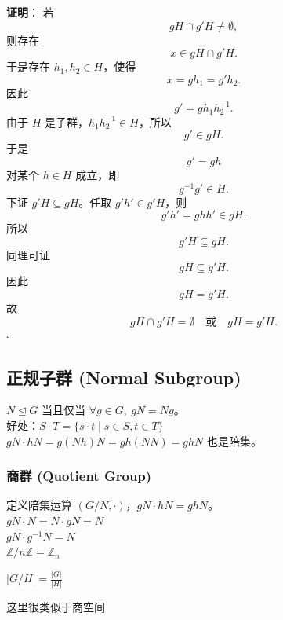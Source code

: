 \documentclass[12pt, a4paper]{article}
\begin{document}
\textbf{证明}：
若
\[
gH \cap g'H \neq \emptyset,
\]
则存在
\[
x \in gH \cap g'H.
\]
于是存在 \(h_1,h_2 \in H\)，使得
\[
x=gh_1=g'h_2.
\]
因此
\[
g'=g h_1 h_2^{-1}.
\]
由于 \(H\) 是子群，\(h_1h_2^{-1}\in H\)，所以
\[
g' \in gH.
\]
于是
\[
g'=gh
\]
对某个 \(h\in H\) 成立，即
\[
g^{-1}g' \in H.
\]
下证 \(g'H \subseteq gH\)。任取 \(g'h'\in g'H\)，则
\[
g'h'=g h h' \in gH.
\]
所以
\[
g'H \subseteq gH.
\]
同理可证
\[
gH \subseteq g'H.
\]
因此
\[
gH=g'H.
\]
故
\[
gH \cap g'H = \emptyset
\quad\text{或}\quad
gH = g'H.
\]
\hfill \(\square\)

\subsection*{正规子群 (Normal Subgroup)}
$N \trianglelefteq G$ 当且仅当 $\forall g \in G, \ gN = Ng$。\\
好处：$S \cdot T = \{s \cdot t \mid s \in S, t \in T\}$ \\
$gN \cdot hN = g(Nh)N = gh(NN) = ghN$ 也是陪集。

\subsubsection*{商群 (Quotient Group)}
定义陪集运算 $(G/N, \cdot)$，$gN \cdot hN = ghN$。\\
$gN \cdot N = N \cdot gN = N$ \\
$gN \cdot g^{-1}N = N$ \\
$\mathbb{Z} / n\mathbb{Z} = \mathbb{Z}_n$

$|G / H| = \frac{|G|}{|H|}$

这里很类似于商空间
\end{document}
